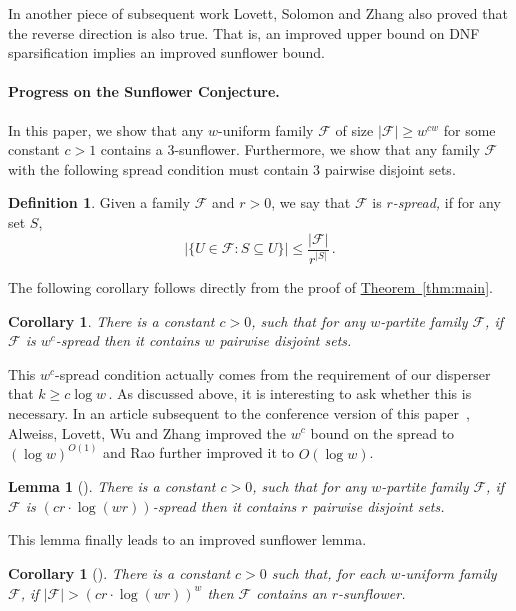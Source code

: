 \documentclass[11pt]{article}
\numberwithin{equation}{section}
\newtheorem{lemma}[theorem]{Lemma}
\newtheorem{corollary}[theorem]{Corollary}
\theoremstyle{definition}
\newtheorem{definition}[theorem]{Definition}
\theoremstyle{plain}
\newcommand{\expref}[2]{\hyperref[#2]{#1~\ref{#2}}}
\newcommand{\calF}{\mathcal{F}} %
\begin{document}
%
%
In another piece of subsequent work %
Lovett, Solomon and Zhang \cite{lovett2019dnf} also proved that 
the reverse direction is also true. That is, an improved upper bound
on DNF sparsification implies an improved sunflower bound.

%
%
\paragraph{Progress on the Sunflower Conjecture.}
In this paper, we show that any $w$-uniform family 
$\calF$ of size $|\calF|\geq w^{cw}$
for some constant $c>1$ contains a $3$-sunflower.
Furthermore, we show that any family 
$\calF$ with the following
spread condition must contain $3$ pairwise disjoint sets.

\begin{definition} \label{def:spread} Given a family
$\calF$ and $r>0$, we say that $\calF$ is \emph{$r$-spread,}
if for any set $S$, %
%
\[ \big|\{U\in\calF : S\subseteq U\}\big| \leq
%
\frac{\big|\calF\big|}{r^{|S|}}\,.  %
\]
\end{definition}

The following corollary follows directly from the proof of
\expref{Theorem}{thm:main}.

\begin{corollary} There is a constant $c>0$, such that for any
%
$w$-partite
%
family   %
$\calF$, if $\calF$ is $w^{c}$-spread then it
contains $w$ pairwise disjoint sets.
\end{corollary}

This $w^{c}$-spread condition actually comes from the requirement of
our disperser that $k \geq c \log w$\,. As discussed above, it is
interesting to ask whether this is necessary.
%
%
%
In an article subsequent to the conference version
of this paper~\cite{conf-version},  %
Alweiss, Lovett, Wu and Zhang \cite{alweiss2020improved} improved
%
%
%
the $w^c$ bound on the spread %
%
to $(\log w)^{O(1)}$ and Rao \cite{rao2020coding} further
improved it to $O(\log w)$.

\begin{lemma}[\cite{alweiss2020improved,rao2020coding}] 
There is a constant $c>0$, such that for any
%
$w$-partite  %
family $\calF$, if $\calF$ is $(c r\cdot \log (wr))$-spread then
it contains $r$ pairwise disjoint sets.
\end{lemma}

This lemma finally leads to
an improved sunflower lemma.
%
%
%

\begin{corollary}[\cite{alweiss2020improved,rao2020coding}] %
There is a constant $c>0$ such that, for each
%
%
$w$-uniform family  %
%
$\calF$, if $|\calF| > (c r\cdot \log (wr))^{w}$
then $\calF$ contains an $r$-sunflower.
\end{corollary}
\end{document}
